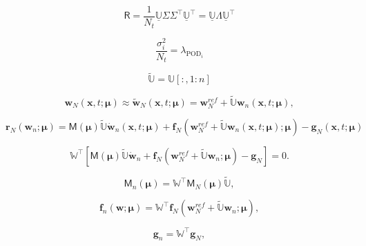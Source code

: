 \documentclass[11pt]{article}
\renewcommand{\vec}[1]{\mathbf{#1}}
\newcommand{\mat}[1]{\mathsf{#1}}
\begin{document}
\begin{equation}
\mat{R} = \frac{1}{N_t} \underline{\mathbb{U}} \mat{\Sigma} \mat{\Sigma}^\top \underline{\mathbb{U}}^\top = \underline{\mathbb{U}}\mat{\Lambda}\underline{\mathbb{U}}^\top
\label{eq:pod-svd}
\end{equation}

\begin{equation}
\frac{\sigma_i^2}{N_t} = \lambda_{\text{POD}_i}
\label{eq:SVD_POD}
\end{equation}

\begin{equation}
\widetilde{\mathbb{U}} = \mathbb{U}[:,1:n]
\label{eq:U_tilde}
\end{equation}

\begin{equation}
\vec{w}_N(\vec{x},t; \boldsymbol{\mu}) \approx \widetilde{\vec{w}}_N(\vec{x},t; \boldsymbol{\mu}) = \vec{w}^{ref}_N+\widetilde{\mathbb{U}}  \vec{w}_n(\vec{x},t; \boldsymbol{\mu}),
\label{eq:w_ned_gal}
\end{equation}

\begin{equation}
\vec{r}_{N}(\vec{w}_n;\boldsymbol{\mu}) = \mat{M}(\boldsymbol{\mu})\widetilde{\mathbb{U}}\dot{\vec{w}}_n(\vec{x},t; \boldsymbol{\mu}) + \vec{f}_N(\vec{w}^{ref}_N+\widetilde{\mathbb{U}}\vec{w}_n(\vec{x},t; \boldsymbol{\mu}); \boldsymbol{\mu}) - \vec{g}_N(\vec{x},t; \boldsymbol{\mu})
\label{eq:residual_gov_eq_gal}
\end{equation}

\begin{equation}
\mathbb{W}^\top \left[ \mat{M}(\boldsymbol{\mu}) \widetilde{\mathbb{U}} \dot{\vec{w}}_n + \vec{f}_N(\vec{w}^{ref}_N+\widetilde{\mathbb{U}} \vec{w}_n; \boldsymbol{\mu}) - \vec{g}_N \right] = 0.
\label{eq:PG_projection}
\end{equation}

\begin{equation}
\mat{M}_{n}(\boldsymbol{\mu}) = \mathbb{W}^\top \mat{M}_{N}(\boldsymbol{\mu}) \widetilde{\mathbb{U}},
\end{equation}

\begin{equation}
\vec{f}_n(\vec{w}; \boldsymbol{\mu}) = \mathbb{W}^\top \vec{f}_N(\vec{w}^{ref}_N+\widetilde{\mathbb{U}} \vec{w}_n; \boldsymbol{\mu}),
\end{equation}

\begin{equation}
\vec{g}_n = \mathbb{W}^\top \vec{g}_N,
\end{equation}
\end{document}
